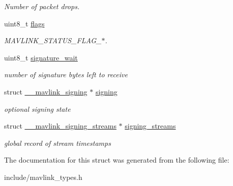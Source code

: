 \begin{DoxyCompactItemize}
\begin{DoxyCompactList}\small\item\em Number of packet drops. \end{DoxyCompactList}\item 
uint8\+\_\+t \hyperlink{struct____mavlink__status_aa2585d779da0ab21273a8d92de9a0ebe}{flags}\hypertarget{struct____mavlink__status_aa2585d779da0ab21273a8d92de9a0ebe}{}\label{struct____mavlink__status_aa2585d779da0ab21273a8d92de9a0ebe}

\begin{DoxyCompactList}\small\item\em M\+A\+V\+L\+I\+N\+K\+\_\+\+S\+T\+A\+T\+U\+S\+\_\+\+F\+L\+A\+G\+\_\+$\ast$. \end{DoxyCompactList}\item 
uint8\+\_\+t \hyperlink{struct____mavlink__status_ad2437d42e6e096c1b4d50d78fce7ee1a}{signature\+\_\+wait}\hypertarget{struct____mavlink__status_ad2437d42e6e096c1b4d50d78fce7ee1a}{}\label{struct____mavlink__status_ad2437d42e6e096c1b4d50d78fce7ee1a}

\begin{DoxyCompactList}\small\item\em number of signature bytes left to receive \end{DoxyCompactList}\item 
struct \hyperlink{struct____mavlink__signing}{\+\_\+\+\_\+mavlink\+\_\+signing} $\ast$ \hyperlink{struct____mavlink__status_aed24a8983aa3f005c04eca07c8403635}{signing}\hypertarget{struct____mavlink__status_aed24a8983aa3f005c04eca07c8403635}{}\label{struct____mavlink__status_aed24a8983aa3f005c04eca07c8403635}

\begin{DoxyCompactList}\small\item\em optional signing state \end{DoxyCompactList}\item 
struct \hyperlink{struct____mavlink__signing__streams}{\+\_\+\+\_\+mavlink\+\_\+signing\+\_\+streams} $\ast$ \hyperlink{struct____mavlink__status_a2f0ebcf65eac8fa5f0d2430d39663ac2}{signing\+\_\+streams}\hypertarget{struct____mavlink__status_a2f0ebcf65eac8fa5f0d2430d39663ac2}{}\label{struct____mavlink__status_a2f0ebcf65eac8fa5f0d2430d39663ac2}

\begin{DoxyCompactList}\small\item\em global record of stream timestamps \end{DoxyCompactList}\end{DoxyCompactItemize}


The documentation for this struct was generated from the following file\+:\begin{DoxyCompactItemize}
\item 
include/mavlink\+\_\+types.\+h\end{DoxyCompactItemize}
